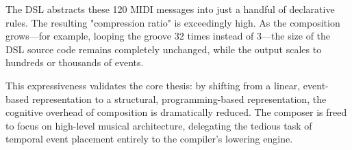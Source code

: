 The DSL abstracts these 120 MIDI messages into just a handful of declarative rules. The resulting
"compression ratio" is exceedingly high. As the composition grows—for example, looping the groove 32 times
instead of 3—the size of the DSL source code remains completely unchanged, while the output scales to
hundreds or thousands of events.

This expressiveness validates the core thesis: by shifting from a linear, event-based representation to a
structural, programming-based representation, the cognitive overhead of composition is dramatically reduced.
The composer is freed to focus on high-level musical architecture, delegating the tedious task of temporal
event placement entirely to the compiler's lowering engine.
